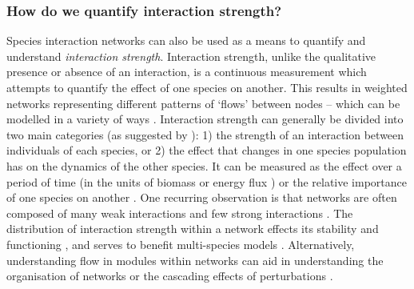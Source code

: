 \subsubsection{How do we quantify interaction
strength?}\label{how-do-we-quantify-interaction-strength}

Species interaction networks can also be used as a means to quantify and
understand \emph{interaction strength}. Interaction strength, unlike the
qualitative presence or absence of an interaction, is a continuous
measurement which attempts to quantify the effect of one species on
another. This results in weighted networks representing different
patterns of `flows' between nodes -- which can be modelled in a variety
of ways \cite{Borrett2019WalPar}. Interaction strength can generally be
divided into two main categories (as suggested by \cite{Berlow2004IntStr}): 1)
the strength of an interaction between individuals of each species, or
2) the effect that changes in one species population has on the dynamics
of the other species. It can be measured as the effect over a period of
time (in the units of biomass or energy flux \cite{Barnes2018EneFlu,
Brown2004MetThe}) or the relative importance of one species on
another \cite{Heleno2014EcoNet, Berlow2004IntStr, Wootton2005MeaInt}.
One recurring observation is that networks are often composed of many
weak interactions and few strong interactions \cite{Berlow2004IntStr}.
The distribution of interaction strength within a network effects its
stability \cite{Neutel2002StaRea, Ruiter1995EnePat} and functioning
\cite{Duffy2002BioEco, Montoya2003FooWeb}, and serves to benefit
multi-species models \cite{Wootton2005MeaInt}. Alternatively,
understanding flow in modules within networks can aid in understanding
the organisation of networks \cite{Farage2021IdeFlo, Montoya2002SmaWor}
or the cascading effects of perturbations \cite{Gaiarsa2019IntStr}.

